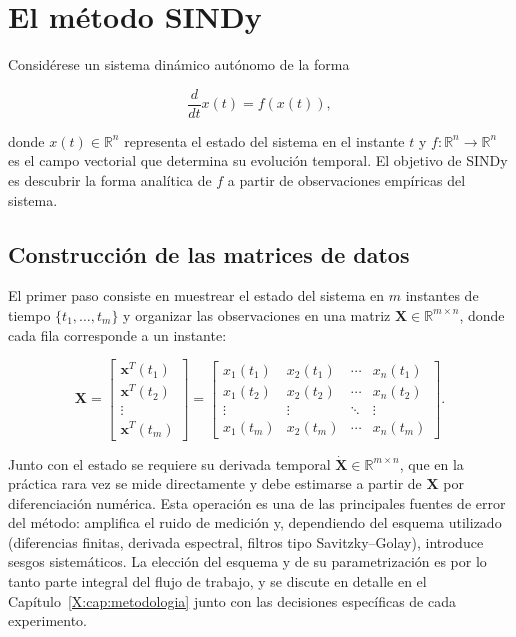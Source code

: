\section{El método SINDy}
\label{2:sec:intro_metodo}

Considérese un sistema dinámico autónomo de la forma

\begin{equation}
\frac{d}{dt}x(t) = f(x(t)),
\tag{2.1}
\label{eq:sistema_dinamico}
\end{equation}

donde $x(t) \in \mathbb{R}^n$ representa el estado del sistema en el instante $t$ y $f: \mathbb{R}^n \to \mathbb{R}^n$ es el campo vectorial que determina su evolución temporal. El objetivo de SINDy es descubrir la forma analítica de $f$ a partir de observaciones empíricas del sistema.

\subsection{Construcción de las matrices de datos}

El primer paso consiste en muestrear el estado del sistema en $m$ instantes de tiempo $\{t_1, \dots, t_m\}$ y organizar las observaciones en una matriz $\mathbf{X} \in \mathbb{R}^{m \times n}$, donde cada fila corresponde a un instante:

\[
\mathbf{X} =
\begin{bmatrix}
\mathbf{x}^T(t_1) \\
\mathbf{x}^T(t_2) \\
\vdots \\
\mathbf{x}^T(t_m)
\end{bmatrix}
=
\begin{bmatrix}
x_1(t_1) & x_2(t_1) & \cdots & x_n(t_1) \\
x_1(t_2) & x_2(t_2) & \cdots & x_n(t_2) \\
\vdots & \vdots & \ddots & \vdots \\
x_1(t_m) & x_2(t_m) & \cdots & x_n(t_m)
\end{bmatrix}.
\]

Junto con el estado se requiere su derivada temporal $\dot{\mathbf{X}} \in \mathbb{R}^{m \times n}$, que en la práctica rara vez se mide directamente y debe estimarse a partir de $\mathbf{X}$ por diferenciación numérica. Esta operación es una de las principales fuentes de error del método: amplifica el ruido de medición y, dependiendo del esquema utilizado (diferencias finitas, derivada espectral, filtros tipo Savitzky--Golay), introduce sesgos sistemáticos. La elección del esquema y de su parametrización es por lo tanto parte integral del flujo de trabajo, y se discute en detalle en el Capítulo~\ref{X:cap:metodologia} junto con las decisiones específicas de cada experimento.


